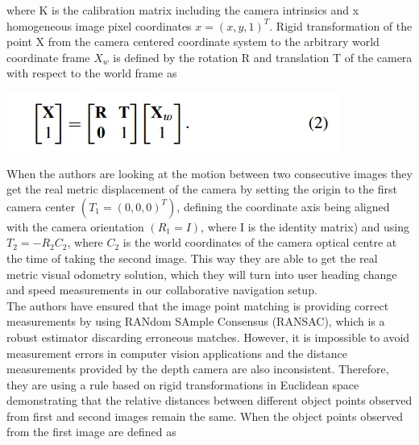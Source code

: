 where K is the calibration matrix including the camera intrinsics and x homogeneous image pixel coordinates
\begin{math}x = (x, y, 1)^T \end{math}. Rigid transformation of the point X from
the camera centered coordinate system to the arbitrary world
coordinate frame \begin{math}
X_w
\end{math} is defined by the rotation R and translation T of the camera with respect to the world frame as
\begin{center}
   \includegraphics{eq2.jpg}
   \end{center}
When the authors are looking at the motion between two consecutive images they  get the real metric displacement of the camera by setting the origin to the first camera center
\begin{math}(T_1 = (0, 0, 0)^T )\end{math}, defining the coordinate axis being aligned
with the camera orientation \begin{math}(R_1 = I)\end{math}, where I is the identity
matrix) and using \begin{math}T_2 = −R_2C_2 \end{math}, where \begin{math}C_2 \end{math} is the world
coordinates of the camera optical centre at the time of taking
the second image. This way they are able to get the real
metric visual odometry solution, which they will turn into user
heading change and speed measurements in our collaborative
navigation setup.\\
The authors have ensured that the image point matching is providing correct measurements by using RANdom SAmple Consensus (RANSAC), which is a robust estimator
discarding erroneous matches. However, it is impossible to
avoid measurement errors in computer vision applications and
the distance measurements provided by the depth camera are
also inconsistent. Therefore, they are using a rule based on
rigid transformations in Euclidean space demonstrating that
the relative distances between different object points observed
from first and second images remain the same. When
the object points observed from the first image are defined as
